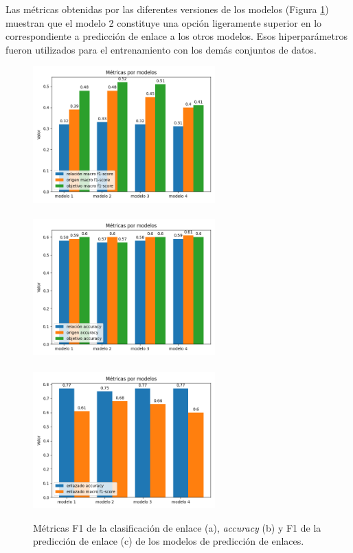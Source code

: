 \documentclass[a4paper,11pt,twocolumn,twoside]{article}
\begin{document}
Las métricas obtenidas por las diferentes versiones de los modelos 
(Figura \ref{fig:link_prediction_model_metrics}) 
muestran que el modelo 2 constituye una opción ligeramente superior en lo correspondiente a 
predicción de enlace a los otros modelos. Esos hiperparámetros
fueron utilizados para el entrenamiento con los demás conjuntos de datos.

\begin{figure}[h]
	\centering
	\includegraphics[width=7cm]{Graphics/persuasive_essays_all_linked_all_relation_f1_scores.png}\\
	\\
	\includegraphics[width=7cm]{Graphics/persuasive_essays_all_linked_all_relation_accuracy.png}\\
	\\
	\includegraphics[width=7cm]{Graphics/persuasive_essays_all_linked_all_relation_linked.png}\\
	\caption{Métricas F1 de la clasificación de enlace (a), \textit{accuracy} (b) y
		F1 de la predicción de enlace (c) de los modelos de predicción de enlaces.}
	\label{fig:link_prediction_model_metrics}
\end{figure}
\end{document}
